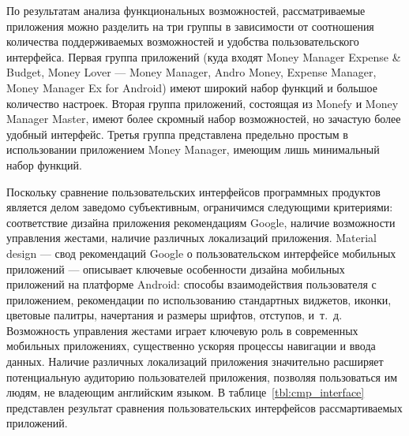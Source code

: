 По результатам анализа функциональных возможностей, рассматриваемые приложения
можно разделить на три группы в зависимости от соотношения количества поддерживаемых
возможностей и удобства пользовательского интерфейса.
Первая группа приложений (куда входят
Money Manager Expense \& Budget, Money Lover --- Money Manager,
Andro Money, Expense Manager, Money Manager Ex for Android) имеют
широкий набор функций и большое количество настроек.
Вторая группа приложений, состоящая из Monefy и Money Manager Master,
имеют более скромный набор возможностей, но зачастую более удобный интерфейс.
Третья группа представлена предельно простым в использовании приложением Money Manager,
имеющим лишь минимальный набор функций.

Поскольку сравнение пользовательских интерфейсов программных продуктов
является делом заведомо субъективным, ограничимся следующими критериями:
соответствие дизайна приложения рекомендациям Google, наличие возможности управления жестами,
наличие различных локализаций приложения.
Material design ---
свод рекомендаций Google о пользовательском интерфейсе мобильных приложений ---
описывает ключевые особенности дизайна мобильных приложений на платформе Android:
способы взаимодействия пользователя с приложением,
рекомендации по использованию стандартных виджетов,
иконки, цветовые палитры, начертания и размеры шрифтов, отступов, и~т.~д.
Возможность управления жестами играет ключевую роль в современных мобильных приложениях,
существенно ускоряя процессы навигации и ввода данных.
Наличие различных локализаций приложения значительно расширяет потенциальную
аудиторию пользователей приложения, позволяя пользоваться им людям, не владеющим
английским языком. В таблице~\ref{tbl:cmp_interface} представлен результат сравнения
пользовательских интерфейсов рассмартиваемых приложений.

